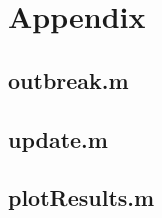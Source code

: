 \documentclass[11pt]{article}
\begin{document}
\section{Appendix}

\subsection{outbreak.m}

\bigskip
\bigskip
\bigskip

\subsection{update.m}

\bigskip
\bigskip
\bigskip

\subsection{plotResults.m}

\bigskip
\bigskip
\bigskip
\end{document}
